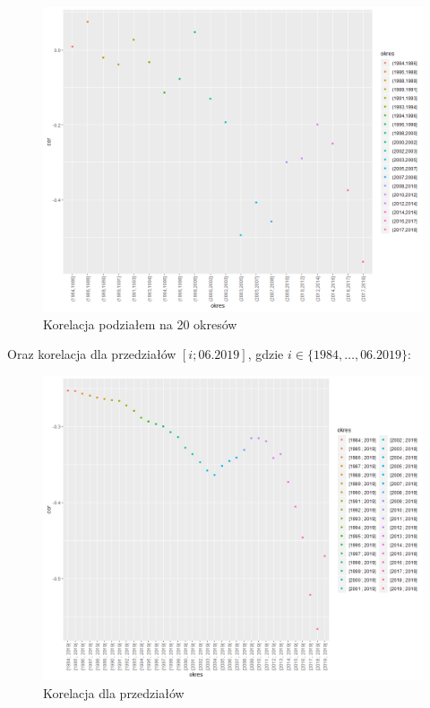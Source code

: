 \documentclass[12pt]{article}
\begin{document}
\begin{figure}[ht!]
\centering
\includegraphics[width=\linewidth]{gold_USDPLN_korelacja_przedzialy.png}
\caption{Korelacja podziałem na 20 okresów}
\end{figure}

Oraz korelacja dla przedziałów $[i;06.2019]$, gdzie $i \in \{1984, \ldots, 06.2019\}$:
\newpage
\begin{figure}[ht!]
\centering
\includegraphics[width=\linewidth]{gold_USDPLN_korelacja_do_teraz.png}
\caption{Korelacja dla przedziałów}
\end{figure}
\end{document}
